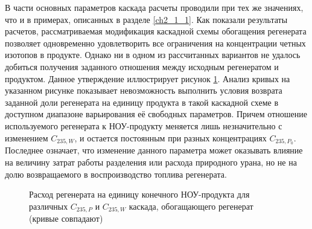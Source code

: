 В части основных параметров каскада расчеты проводили при тех же значениях, что и в примерах, описанных в разделе \ref{ch2_1_1}. Как показали результаты расчетов, рассматриваемая модификация каскадной схемы обогащения регенерата позволяет одновременно удовлетворить все ограничения на концентрации четных изотопов в продукте. Однако ни в одном из рассчитанных вариантов не удалось добиться получения заданного отношения между исходным регенератом и продуктом. Данное утверждение иллюстрирует рисунок \ref{Figure_10}. Анализ кривых на указанном рисунке показывает невозможность выполнить условия возврата заданной доли регенерата на единицу продукта в такой каскадной схеме в доступном диапазоне варьирования её свободных параметров. Причем отношение используемого регенерата к НОУ-продукту меняется лишь незначительно с изменением $C_{235, W}$, и остается постоянным при разных концентрациях $C_{235, P_0}$. Последнее означает, что изменение данного параметра может оказывать влияние на величину затрат работы разделения или расхода природного урана, но не на долю возвращаемого в воспроизводство топлива регенерата.

\begin{figure}[ht]
  \caption{Расход регенерата на единицу конечного НОУ-продукта для различных  $C_{235, P}$ и $C_{235, W}$ каскада, обогащающего регенерат (кривые совпадают)}\label{Figure_10}
\end{figure}



